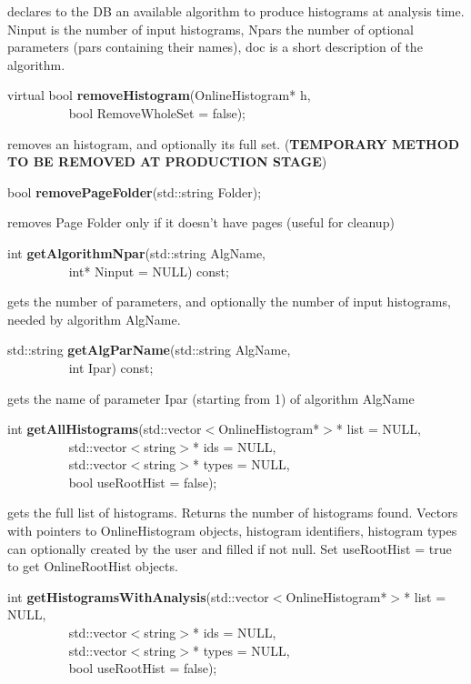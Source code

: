  declares to the DB an available algorithm to produce histograms at
 analysis time. Ninput is the number of input histograms, Npars the
 number of optional parameters (pars containing their names), doc is a short
 description of the algorithm.


\item    virtual bool {\bf removeHistogram}(OnlineHistogram* h,\\\mbox{}~~~~~~~~~
			       bool RemoveWholeSet = false);

 removes an histogram, and optionally its full set. 
 ({\bf TEMPORARY METHOD TO BE REMOVED AT PRODUCTION STAGE})


\item    bool {\bf removePageFolder}(std::string Folder);


 removes Page Folder only if it doesn't have pages (useful for cleanup)


\item    int {\bf getAlgorithmNpar}(std::string AlgName,\\\mbox{}~~~~~~~~~
		       int* Ninput = NULL) const;

 gets the number of parameters, and optionally the number of input histograms, needed by algorithm AlgName.


\item    std::string {\bf getAlgParName}(std::string AlgName,\\\mbox{}~~~~~~~~~
		       int Ipar) const;

 gets the name of parameter Ipar (starting from 1) of algorithm AlgName


\item    int {\bf getAllHistograms}(std::vector$<$OnlineHistogram*$>$* list = NULL,\\\mbox{}~~~~~~~~~
		       std::vector$<$string$>$* ids = NULL,\\\mbox{}~~~~~~~~~
		       std::vector$<$string$>$* types = NULL,\\\mbox{}~~~~~~~~~
		       bool useRootHist = false);

 gets the full list of histograms. Returns the number of histograms found. Vectors with pointers
 to OnlineHistogram objects, histogram identifiers, histogram types can optionally created  by the user
 and filled if not null. Set useRootHist = true to get OnlineRootHist objects.


\item    int {\bf getHistogramsWithAnalysis}(std::vector$<$OnlineHistogram*$>$* list = NULL,\\\mbox{}~~~~~~~~~
				std::vector$<$string$>$* ids = NULL,\\\mbox{}~~~~~~~~~
				std::vector$<$string$>$* types = NULL,\\\mbox{}~~~~~~~~~
				bool useRootHist = false);

